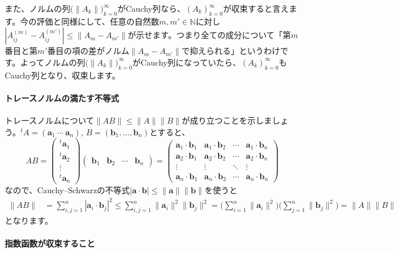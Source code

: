 また、ノルムの列$\bigl(\|A_k\|\bigr)_{k = 0}^{\infty}$がCauchy列なら、$(A_k)_{k = 0}^{\infty}$が収束すると言えます。今の評価と同様にして、任意の自然数$m, m'\in\mathbb{N}$に対し$|A^{(m)}_{ij} - A^{(m')}_{ij}| \leq \|A_m - A_{m'}\|$が示せます。つまり全ての成分について「第$m$番目と第$m'$番目の項の差がノルム$\|A_m - A_{m'}\|$で抑えられる」というわけです。よってノルムの列$\bigl(\|A_k\|\bigr)_{k = 0}^{\infty}$がCauchy列になっていたら、$(A_k)_{k = 0}^{\infty}$もCauchy列となり、収束します。


\paragraph{トレースノルムの満たす不等式}

トレースノルムについて$\|AB\| \leq \|A\| \|B\|$が成り立つことを示しましょう。${}^t\!A = (\bm{a}_1 \ \cdots \ \bm{a}_n)$, $B = (\bm{b}_1, \ldots, \bm{b}_n)$とすると、
\[
AB =
\begin{pmatrix}
{}^t\bm{a}_1 \\
{}^t\bm{a}_2 \\
\vdots \\
{}^t\bm{a}_n
\end{pmatrix}
\begin{pmatrix}
\bm{b}_1 & \bm{b}_2 & \cdots & \bm{b}_n
\end{pmatrix}
=
\begin{pmatrix}
\bm{a}_1 \cdot \bm{b}_1 & \bm{a}_1 \cdot \bm{b}_2 & \cdots & \bm{a}_1 \cdot \bm{b}_n \\
\bm{a}_2 \cdot \bm{b}_1 & \bm{a}_2 \cdot \bm{b}_2 & \cdots & \bm{a}_2 \cdot \bm{b}_n \\
\vdots & \vdots & \ddots & \vdots \\
\bm{a}_n \cdot \bm{b}_1 &  \bm{a}_n \cdot \bm{b}_2 & \cdots & \bm{a}_n \cdot \bm{b}_n
\end{pmatrix}
\]
なので、Cauchy--Schwarzの不等式$|\bm{a}\cdot\bm{b}| \leq \|\bm{a}\| \|\bm{b}\| $を使うと
\begin{align*}
\|AB\|
&= \sum_{i, j = 1}^n |\bm{a}_i \cdot \bm{b}_j|^2
\leq \sum_{i, j = 1}^n \|\bm{a}_i\|^2 \|\bm{b}_j\|^2
= \Biggl(\sum_{i = 1}^n \|\bm{a}_i\|^2 \Biggr) \Biggl( \sum_{j = 1}^n \|\bm{b}_j\|^2 \Biggr)
= \|A\| \|B\|
\end{align*}
となります。

\paragraph{指数函数が収束すること}

